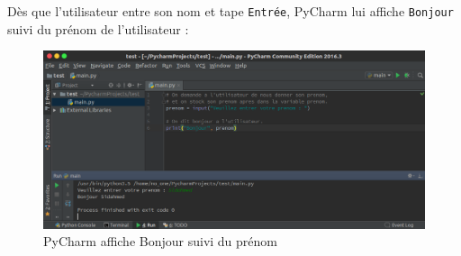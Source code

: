 \documentclass[12pt]{article}
\newcommand{\code}[1]{\colorbox{light-gray}{\texttt{#1}}}
\begin{document}
            Dès que l'utilisateur entre son nom et tape \code{Entrée}, PyCharm lui affiche \code{Bonjour} suivi
            du prénom de l'utilisateur :
            \begin{figure}[H]
                \centering
                \includegraphics[width=\linewidth]{img/17_input.png}
                \caption{PyCharm affiche Bonjour suivi du prénom}
            \end{figure}
\end{document}
